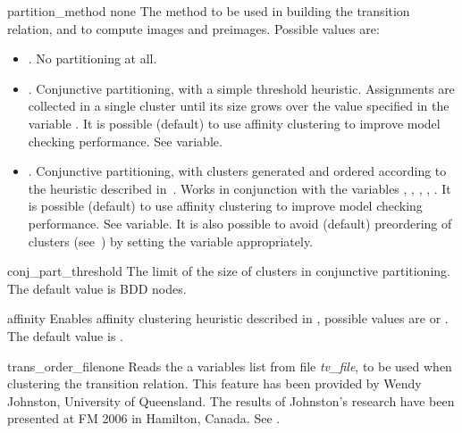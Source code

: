 \begin{nusmvVar} {partition\_method}
{} {none} The method to
be used in building the transition relation, and to compute images and
preimages. Possible values are:

\begin{itemize}
\item {}. No partitioning at all.

\item {}. Conjunctive partitioning, with a simple
threshold heuristic. Assignments are collected in a single cluster
until its size grows over the value specified in the variable
. It is possible (default) to use affinity
clustering to improve model checking performance. See
 variable.

\item {}. Conjunctive partitioning, with clusters
generated and ordered according to the heuristic described
in~\cite{RAP+95}. Works in conjunction with the variables
,
, , , .
It is possible (default) to use affinity clustering to improve model
checking performance. See  variable. It is also possible
to avoid (default) preordering of clusters (see~\cite{RAP+95}) by
setting the  variable appropriately.
\end{itemize}

\end{nusmvVar}

\begin{nusmvVar}{conj\_part\_threshold}{}{}
The limit of the size of clusters in conjunctive partitioning. The
default value is  BDD nodes.
\end{nusmvVar}

\begin{nusmvVar} {affinity}{}{}
Enables affinity clustering heuristic described in \cite{MOON00},
possible values are  or . The default value is .
\end{nusmvVar}

\begin{nusmvVar} {trans\_order\_file}{}{none}
Reads the a variables list from file {\it tv\_file}, to be used when
clustering the transition relation.  This feature has been provided by
Wendy Johnston, University of Queensland. The results of Johnston's
research have been presented at FM 2006 in Hamilton, Canada. See
\cite{fm06}.
\end{nusmvVar}

